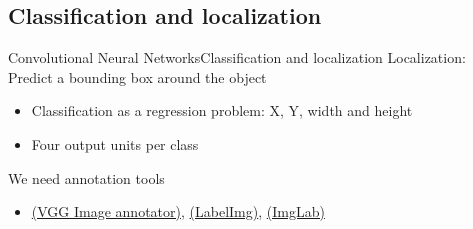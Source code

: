 \documentclass[10pt,compress]{beamer} %
\begin{document}
\subsection{Classification and localization}
\begin{frame}{Convolutional Neural Networks}{Classification and localization}
	Localization: Predict a bounding box around the object
    	\begin{itemize}
    		\item Classification as a regression problem: X, Y, width and height
        	\item Four output units per class
    	\end{itemize}

    We need annotation tools
    \begin{itemize}
	    \item \href{https://www.robots.ox.ac.uk/~vgg/software/via/}{(VGG Image annotator)}, \href{https://github.com/heartexlabs/labelImg}{(LabelImg)}, \href{(https://imglab.in/)}{(ImgLab)}	
    \end{itemize}


\end{frame}
\end{document}
